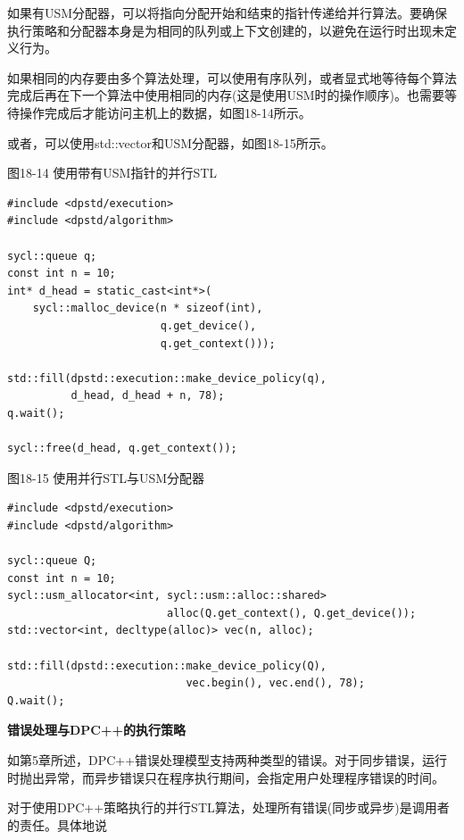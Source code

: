 如果有USM分配器，可以将指向分配开始和结束的指针传递给并行算法。要确保执行策略和分配器本身是为相同的队列或上下文创建的，以避免在运行时出现未定义行为。\par

如果相同的内存要由多个算法处理，可以使用有序队列，或者显式地等待每个算法完成后再在下一个算法中使用相同的内存(这是使用USM时的操作顺序)。也需要等待操作完成后才能访问主机上的数据，如图18-14所示。\par

或者，可以使用std::vector和USM分配器，如图18-15所示。\par

\hspace*{\fill} \par %
图18-14 使用带有USM指针的并行STL
\begin{lstlisting}[caption={}]
#include <dpstd/execution>
#include <dpstd/algorithm>

sycl::queue q;
const int n = 10;
int* d_head = static_cast<int*>(
	sycl::malloc_device(n * sizeof(int),
						q.get_device(), 
						q.get_context()));
						
std::fill(dpstd::execution::make_device_policy(q),
		  d_head, d_head + n, 78);
q.wait();

sycl::free(d_head, q.get_context());
\end{lstlisting}

\hspace*{\fill} \par %
图18-15 使用并行STL与USM分配器
\begin{lstlisting}[caption={}]
#include <dpstd/execution>
#include <dpstd/algorithm>

sycl::queue Q;
const int n = 10;
sycl::usm_allocator<int, sycl::usm::alloc::shared> 
						 alloc(Q.get_context(), Q.get_device());
std::vector<int, decltype(alloc)> vec(n, alloc);

std::fill(dpstd::execution::make_device_policy(Q), 
							vec.begin(), vec.end(), 78);
Q.wait();
\end{lstlisting}

\hspace*{\fill} \par %
\textbf{错误处理与DPC++的执行策略}

如第5章所述，DPC++错误处理模型支持两种类型的错误。对于同步错误，运行时抛出异常，而异步错误只在程序执行期间，会指定用户处理程序错误的时间。\par

对于使用DPC++策略执行的并行STL算法，处理所有错误(同步或异步)是调用者的责任。具体地说\par

